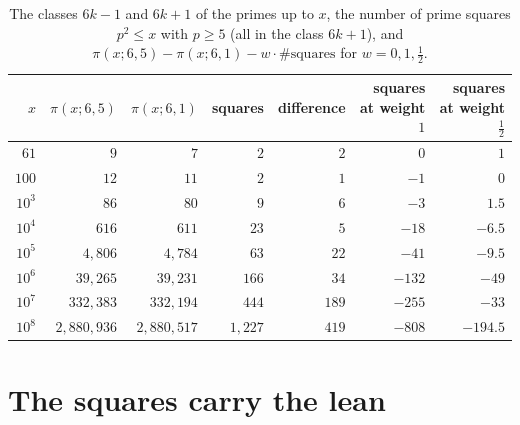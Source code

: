 \documentclass[11pt]{article}
\theoremstyle{definition}\newtheorem{definition}[theorem]{Definition}
\theoremstyle{remark}\newtheorem{remark}[theorem]{Remark}
\theoremstyle{definition}\newtheorem{axiom}{Axiom}
\begin{document}
\begin{table}[!htbp]\centering\small
\begin{tabular}{@{}rrrrrrr@{}}\toprule
$x$ & $\pi(x;6,5)$ & $\pi(x;6,1)$ & squares & difference & squares at weight $1$ & squares at weight $\frac12$\\\midrule
$61$ & $9$ & $7$ & $2$ & $2$ & $0$ & $1$\\
$100$ & $12$ & $11$ & $2$ & $1$ & $-1$ & $0$\\
$10^3$ & $86$ & $80$ & $9$ & $6$ & $-3$ & $1.5$\\
$10^4$ & $616$ & $611$ & $23$ & $5$ & $-18$ & $-6.5$\\
$10^5$ & $4{,}806$ & $4{,}784$ & $63$ & $22$ & $-41$ & $-9.5$\\
$10^6$ & $39{,}265$ & $39{,}231$ & $166$ & $34$ & $-132$ & $-49$\\
$10^7$ & $332{,}383$ & $332{,}194$ & $444$ & $189$ & $-255$ & $-33$\\
$10^8$ & $2{,}880{,}936$ & $2{,}880{,}517$ & $1{,}227$ & $419$ & $-808$ & $-194.5$\\\bottomrule
\end{tabular}
\caption{The classes $6k-1$ and $6k+1$ of the primes up to $x$, the number of prime squares $p^2\le x$ with $p\ge5$ (all in the class $6k+1$), and $\pi(x;6,5)-\pi(x;6,1)-w\cdot\#\text{squares}$ for $w=0,1,\frac12$.}\label{tab:classcount}
\end{table}

\section{The squares carry the lean}\label{sec:lean}
\end{document}
